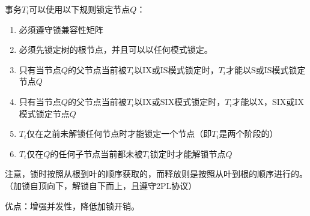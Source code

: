 事务$T_i$可以使用以下规则锁定节点$Q$：
\begin{enumerate}
    \item 必须遵守锁兼容性矩阵
    \item 必须先锁定树的根节点，并且可以以任何模式锁定。
    \item 只有当节点$Q$的父节点当前被$T_i$以IX或IS模式锁定时，$T_i$才能以S或IS模式锁定节点$Q$
    \item 只有当节点$Q$的父节点当前被$T_i$以IX或SIX模式锁定时，$T_i$才能以X，SIX或IX模式锁定节点$Q$
    \item $T_i$仅在之前未解锁任何节点时才能锁定一个节点（即$T_i$是两个阶段的）
    \item $T_i$仅在$Q$的任何子节点当前都未被$T_i$锁定时才能解锁节点$Q$
\end{enumerate}

注意，锁时按照从根到叶的顺序获取的，而释放则是按照从叶到根的顺序进行的。（加锁自顶向下，解锁自下而上，且遵守2PL协议）

优点：增强并发性，降低加锁开销。